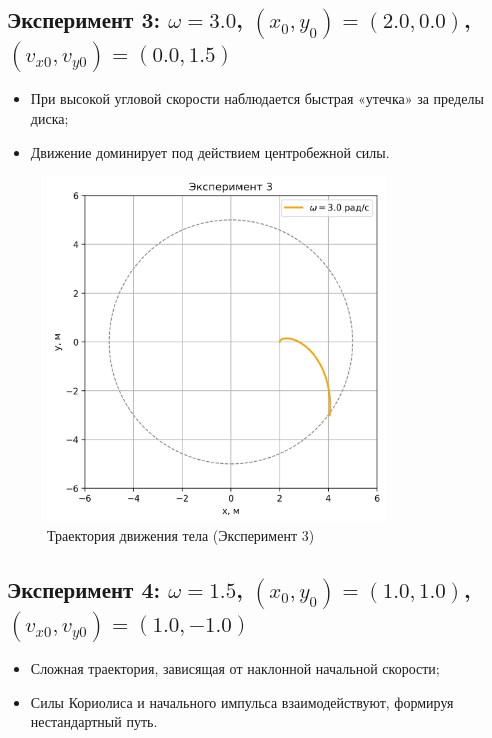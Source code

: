 \documentclass[a4paper,12pt]{article}
\begin{document}
\newpage

\subsection*{Эксперимент 3: $\omega = 3.0$, $(x_0, y_0) = (2.0, 0.0)$, $(v_{x0}, v_{y0}) = (0.0, 1.5)$}

\begin{itemize}
    \item При высокой угловой скорости наблюдается быстрая «утечка» за пределы диска;
    \item Движение доминирует под действием центробежной силы.
\end{itemize}

\begin{figure}[H]
    \centering
    \includegraphics[width=0.8\textwidth]{plots/experiment_3.png}
    \caption{Траектория движения тела (Эксперимент 3)}
\end{figure}

\newpage

\subsection*{Эксперимент 4: $\omega = 1.5$, $(x_0, y_0) = (1.0, 1.0)$, $(v_{x0}, v_{y0}) = (1.0, -1.0)$}

\begin{itemize}
    \item Сложная траектория, зависящая от наклонной начальной скорости;
    \item Силы Кориолиса и начального импульса взаимодействуют, формируя нестандартный путь.
\end{itemize}
\end{document}
